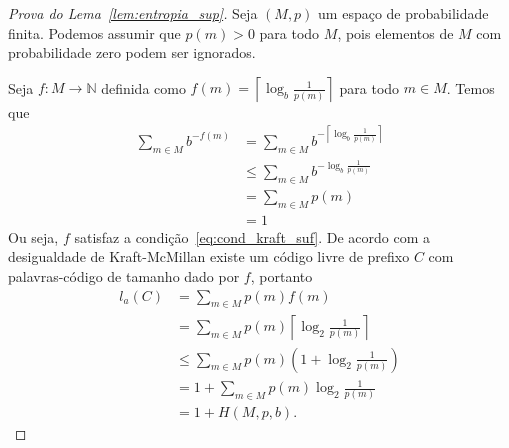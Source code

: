   \begin{proof}[Prova do Lema~\ref{lem:entropia_sup}]
    Seja $(M,p)$ um espaço de probabilidade finita. Podemos assumir que
    $p(m)>0$ para todo $M$, pois elementos de $M$ com probabilidade
    zero podem ser ignorados.

    Seja $f:M\to\mathbb{N}$ definida como $f(m) = \left \lceil{\log_b
      \frac{1}{p(m)} }\right \rceil$ para todo $m\in M$. Temos que
\begin{align*}
  \sum_{m \in M}^{} b^{-f(m)} &=
  \sum_{m \in M}^{} b^{-\left \lceil{\log_b \frac{1}{p(m)} }\right \rceil} \\
  &\leq \sum_{m \in M}^{} b^{-{\log_b \frac{1}{p(m)} }} \\
  &= \sum_{m \in M}^{} p(m) \\
  &= 1
\end{align*}
Ou seja, $f$ satisfaz a condição~\eqref{eq:cond_kraft_suf}. De acordo
com a desigualdade de Kraft-McMillan existe um código livre de prefixo
$C$ com palavras-código de tamanho dado por $f$, portanto
\begin{align*}
  l_a(C) &=
  \sum_{m \in M} p(m) f(m) \\
  &=  \sum_{m \in M} p(m) \left \lceil{\log_2 \frac{1}{p(m)} }\right \rceil \\
&\leq \sum_{m \in M}^{}p(m) \left(1 + \log_2 \frac{1}{p(m)}\right) \\
&= 1 +  \sum_{m \in M}^{}p(m) \log_2 \frac{1}{p(m)} \\
&= 1 + H(M,p,b).
\end{align*}
\end{proof}





